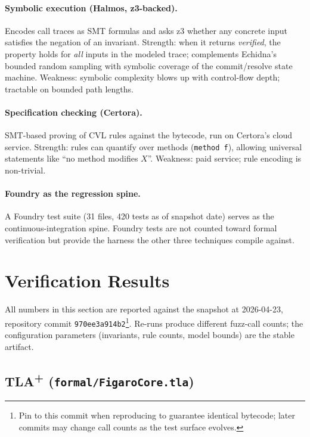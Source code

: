 \documentclass[11pt,a4paper]{article}
\theoremstyle{definition}
\theoremstyle{remark}
\begin{document}
\paragraph{Symbolic execution (Halmos, z3-backed).}
Encodes call traces as SMT formulas and asks z3 whether any concrete
input satisfies the negation of an invariant. Strength: when it
returns \emph{verified}, the property holds for \emph{all} inputs in
the modeled trace; complements Echidna's bounded random sampling
with symbolic coverage of the commit/resolve state machine.
Weakness: symbolic complexity blows up with control-flow depth;
tractable on bounded path lengths.

\paragraph{Specification checking (Certora).}
SMT-based proving of CVL rules against the bytecode, run on
Certora's cloud service. Strength: rules can quantify over methods
(\texttt{method f}), allowing universal statements like ``no method
modifies $X$''. Weakness: paid service; rule encoding is non-trivial.

\paragraph{Foundry as the regression spine.}
A Foundry test suite (31 files, 420 tests as of snapshot date)
serves as the continuous-integration spine. Foundry tests are not
counted toward formal verification but provide the harness the other
three techniques compile against.

\section{Verification Results}
\label{sec:verification-results}

All numbers in this section are reported against the snapshot at
2026-04-23, repository commit
\texttt{970ee3a914b2}\footnote{Pin to this commit when reproducing
to guarantee identical bytecode; later commits may change call
counts as the test surface evolves.}. Re-runs produce different
fuzz-call counts; the configuration parameters (invariants, rule
counts, model bounds) are the stable artifact.

\subsection{TLA\textsuperscript{+} (\texttt{formal/FigaroCore.tla})}
\end{document}
